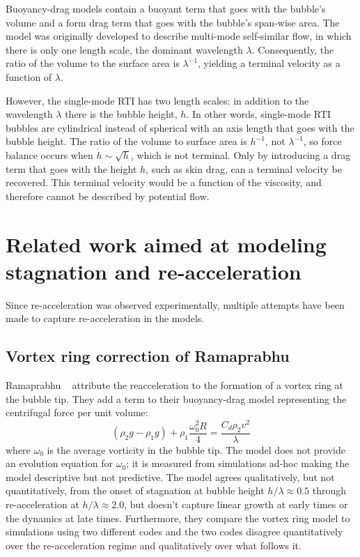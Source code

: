 Buoyancy-drag models contain a buoyant term that goes with the bubble's volume and a form drag term that goes with the bubble's span-wise area.
The model was originally developed to describe multi-mode self-similar flow, in which there is only one length scale, the dominant wavelength $\lambda$.
Consequently, the ratio of the volume to the surface area is $\lambda^{-1}$, yielding a terminal velocity as a function of $\lambda$.

However, the single-mode RTI has two length scales: in addition to the wavelength $\lambda$ there is the bubble height, $h$.
In other words, single-mode RTI bubbles are cylindrical instead of spherical with an axis length that goes with the bubble height.
The ratio of the volume to surface area is $h^{-1}$, not $\lambda^{-1}$, so force balance occurs when $\dot{h} \sim \sqrt{h}$, which is not terminal.
Only by introducing a drag term that goes with the height $h$, such as skin drag, can a terminal velocity be recovered.
This terminal velocity would be a function of the viscosity, and therefore cannot be described by potential flow.

\section{Related work aimed at modeling stagnation and re-acceleration}
Since re-acceleration was observed experimentally, multiple attempts have been made to capture re-acceleration in the models.

\subsection{Vortex ring correction of Ramaprabhu}

Ramaprabhu \etal ~\cite{Ramaprabhu2012} attribute the reacceleration to the formation of a vortex ring at the bubble tip.
They add a term to their buoyancy-drag model representing the centrifugal force per unit volume:
\begin{equation}
\left(\rho_2 g - \rho_1 g\right) + \rho_1 \frac{\omega_0^2 R}{ 4} = \frac{C_d \rho_2 v^2}{\lambda}
\end{equation}
where $\omega_0$ is the average vorticity in the bubble tip.
The model does not provide an evolution equation for $\omega_0$; it is measured from simulations ad-hoc making the model descriptive but not predictive.
The model agrees qualitatively, but not quantitatively, from the onset of stagnation at bubble height $h / \lambda \approx 0.5$ through re-acceleration at $h/\lambda \approx 2.0$, but doesn't capture linear growth at early times or the dynamics at late times.
Furthermore, they compare the vortex ring model to simulations using two different codes and the two codes disagree quantitatively over the re-acceleration regime and qualitatively over what follows it.

